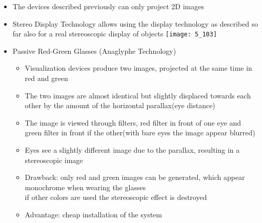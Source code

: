 \documentclass{standalone}
\begin{document}
\begin{itemize}
	\item The devices described previously can only project 2D images
	\item Stereo Display Technology allows using the display technology as described so far also for a real stereoscopic display of objects
	\texttt{[image: 5\_103]}
	
	\item Passive Red-Green Glasses (Anaglyphe Technology)
	\begin{itemize}
		\item Visualization devices produce two images, projected at the same time in red and green
		\item The two images are almost identical but slightly displaced towards each other by the amount of the horizontal parallax(eye distance)
		\item The image is viewed through filters, red filter in front of one eye and green filter in front if the other(with bare eyes the image appear blurred)
		\item Eyes see a slightly different image due to the parallax, resulting in a stereoscopic image
		\item Drawback: only red and green images can be generated, which appear monochrome when wearing the glasses \\
		if other colors are used the stereoscopic effect is destroyed
		\item Advantage: cheap installation of the system
	\end{itemize}


\end{itemize}
\end{document}
